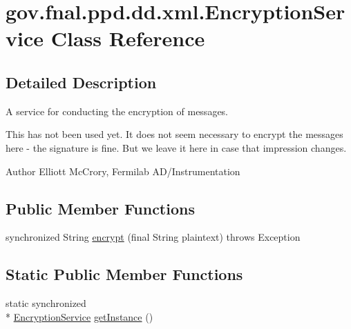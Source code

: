 \hypertarget{classgov_1_1fnal_1_1ppd_1_1dd_1_1xml_1_1EncryptionService}{\section{gov.\-fnal.\-ppd.\-dd.\-xml.\-Encryption\-Service Class Reference}
\label{classgov_1_1fnal_1_1ppd_1_1dd_1_1xml_1_1EncryptionService}
}


\subsection{Detailed Description}
A service for conducting the encryption of messages.

This has not been used yet. It does not seem necessary to encrypt the messages here -\/ the signature is fine. But we leave it here in case that impression changes.

\begin{DoxyAuthor}{Author}
Elliott Mc\-Crory, Fermilab A\-D/\-Instrumentation 
\end{DoxyAuthor}
\subsection*{Public Member Functions}
\begin{DoxyCompactItemize}
\item 
synchronized String \hyperlink{classgov_1_1fnal_1_1ppd_1_1dd_1_1xml_1_1EncryptionService_acc22895b4cdbfad7241cb9aef7e44386}{encrypt} (final String plaintext)  throws Exception 
\end{DoxyCompactItemize}
\subsection*{Static Public Member Functions}
\begin{DoxyCompactItemize}
\item 
static synchronized \\*
\hyperlink{classgov_1_1fnal_1_1ppd_1_1dd_1_1xml_1_1EncryptionService}{Encryption\-Service} \hyperlink{classgov_1_1fnal_1_1ppd_1_1dd_1_1xml_1_1EncryptionService_af86ad51ad97df1cb699364bb83322da5}{get\-Instance} ()
\end{DoxyCompactItemize}


